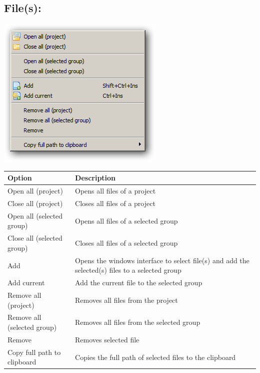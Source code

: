 \hypertarget{menu_project_file}{}
\subsection{File(s):}

\includegraphics[scale=0.50]{./res/menu_project_file.png}\\

\begin{scriptsize}\begin{tabularx}{\textwidth}{>{\hsize=0.4\hsize}X>{\hsize=0.7\hsize}X}\\
    \hline
    \textbf{Option} & \textbf{Description} \\
    \hline
    Open all (project) & Opens all files of a project \\
    Close all (project) & Closes all files of a project \\
    Open all (selected group) & Opens all files of a selected group \\
    Close all (selected group) & Closes all files of a selected group \\
    Add & Opens the windows interface to select file(s) and add the selected(s) files to a selected group \\
    Add current & Add the current file to the selected group \\
    Remove all (project) & Removes all files from the project \\
    Remove all (selected group) & Removes all files from the selected group \\
    Remove & Removes selected file \\
    Copy full path to clipboard & Copies the full path of selected files to the clipboard \\
    \hline
  \end{tabularx}\end{scriptsize}
